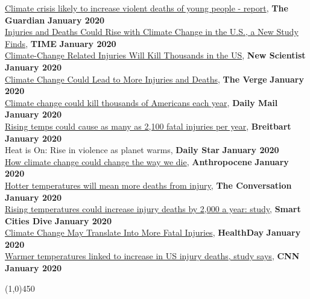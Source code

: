\href{https://www.theguardian.com/environment/2020/jan/13/climate-crisis-likely-to-increase-violent-deaths-of-young-people-report}{Climate crisis likely to increase violent deaths of young people - report}, \textbf{The Guardian} \hfill \textbf{January 2020} \\
\href{https://time.com/5764673/injuries-deaths-climate-change/}{Injuries and Deaths Could Rise with Climate Change in the U.S., a New Study Finds}, \textbf{TIME} \hfill \textbf{January 2020} \\
\href{https://www.newscientist.com/article/2229627-climate-change-related-injuries-will-kill-thousands-in-the-us/}{Climate-Change Related Injuries Will Kill Thousands in the US}, \textbf{New Scientist} \hfill \textbf{January 2020} \\
\href{https://www.theverge.com/2020/1/13/21063690/climate-change-injuries-deaths-weather-violence-drowning-accidents}{Climate Change Could Lead to More Injuries and Deaths}, \textbf{The Verge} \hfill \textbf{January 2020} \\
\href{https://www.dailymail.co.uk/health/article-7882007/Global-temperatures-rising-just-3-degrees-lead-2-100-Americans-dying-year.html}{Climate change could kill thousands of Americans each year}, \textbf{Daily Mail} \hfill \textbf{January 2020} \\
\href{https://www.breitbart.com/news/rising-temps-could-cause-as-many-as-2100-fatal-injuries-per-year/}{Rising temps could cause as many as 2,100 fatal injuries per year}, \textbf{Breitbart} \hfill \textbf{January 2020} \\
\The Heat is On: Rise in violence as planet warms, \textbf{Daily Star} \hfill \textbf{January 2020} \\
\href{http://www.anthropocenemagazine.org/2020/01/how-climate-change-could-change-way-we-die/}{How climate change could change the way we die}, \textbf{Anthropocene} \hfill \textbf{January 2020} \\
\href{https://theconversation.com/car-accidents-drownings-violence-hotter-temperatures-will-mean-more-deaths-from-injury-129628}{Hotter temperatures will mean more deaths from injury}, \textbf{The Conversation} \hfill \textbf{January 2020} \\
\href{https://www.smartcitiesdive.com/news/rising-temperatures-could-increase-injury-deaths-by-2000-a-year-study/570457/}{Rising temperatures could increase injury deaths by 2,000 a year: study}, \textbf{Smart Cities Dive} \hfill \textbf{January 2020} \\
\href{https://consumer.healthday.com/diseases-and-conditions-information-37/heat-and-sunstroke-health-news-370/climate-change-may-translate-into-more-fatal-injuries-753852.html}{Climate Change May Translate Into More Fatal Injuries}, \textbf{HealthDay} \hfill \textbf{January 2020} \\
\href{https://www.cnn.com/2020/01/13/health/warm-temperatures-injury-deaths-study/index.html}{Warmer temperatures linked to increase in US injury deaths, study says}, \textbf{CNN} \hfill \textbf{January 2020}


\begin{center} \line(1,0){450} \end{center}